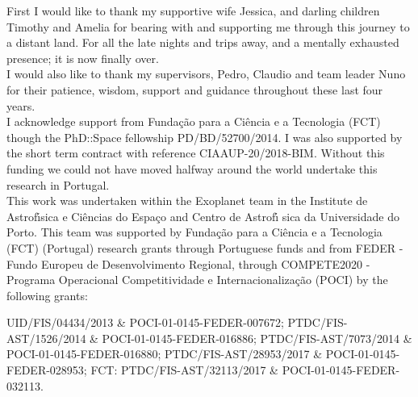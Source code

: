 
\begin{acknowledgements}
    \label{preface:acknowledgements}
    First I would like to thank my supportive wife Jessica, and darling children Timothy and Amelia for bearing with and supporting me through this journey to a distant land.
    For all the late nights and trips away, and a mentally exhausted presence; it is now finally over.\\
    
    I would also like to thank my supervisors, Pedro, Claudio and team leader Nuno for their patience, wisdom, support and guidance throughout these last four years.\\
    
    I acknowledge support from Funda\c{c}\~{a}o para a Ci\^encia e a Tecnologia (FCT) though the PhD::Space fellowship PD/BD/52700/2014.
    I was also supported by the short term contract with reference CIAAUP-20/2018-BIM.
    Without this funding we could not have moved halfway around the world undertake this research in Portugal.\\
    
    This work was undertaken within the Exoplanet team in the Institute de Astrof\'{\i}sica e Ci\^encias do Espa\c{c}o and Centro de Astrof\'{\i} sica da Universidade do Porto.
    This team was supported by Funda\c{c}\~ao para a Ci\^{e}ncia e a Tecnologia (FCT) (Portugal) research grants through Portuguese funds and from FEDER - Fundo Europeu de Desenvolvimento Regional, through COMPETE2020 - Programa Operacional Competitividade e Internacionaliza\c{c}\~{a}o (POCI) by the following grants:

    UID/FIS/04434/2013 \& POCI-01-0145-FEDER-007672;
    PTDC/FIS-AST/1526/2014 \& POCI-01-0145-FEDER-016886;
    PTDC/FIS-AST/7073/2014 \& POCI-01-0145-FEDER-016880;
    PTDC/FIS-AST/28953/2017 \& POCI-01-0145-FEDER-028953;
    FCT: PTDC/FIS-AST/32113/2017 \& POCI-01-0145-FEDER-032113.

\end{acknowledgements}
